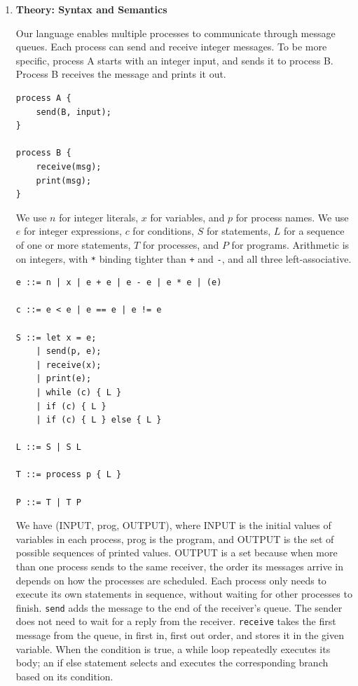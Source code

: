 \documentclass[11pt]{article}
\begin{document}
\begin{enumerate}
\bigbreak


\item
\textbf{Theory: Syntax and Semantics}

Our language enables multiple processes to communicate through message queues. Each process can send and receive
integer messages. To be more specific, process A starts with an integer input, and sends it to process B. Process B
receives the message and prints it out.

\begin{verbatim}
process A {
    send(B, input);
}

process B {
    receive(msg);
    print(msg);
}
\end{verbatim}

We use $n$ for integer literals, $x$ for variables, and $p$ for process names. We use $e$ for integer expressions,
$c$ for conditions, $S$ for statements, $L$ for a sequence of one or more statements, $T$ for processes, and $P$
for programs. Arithmetic is on integers, with \texttt{*} binding tighter than \texttt{+} and \texttt{-}, and all
three left-associative.

\begin{minipage}{\linewidth}
\begin{verbatim}
e ::= n | x | e + e | e - e | e * e | (e)

c ::= e < e | e == e | e != e

S ::= let x = e;
    | send(p, e);
    | receive(x);
    | print(e);
    | while (c) { L }
    | if (c) { L }
    | if (c) { L } else { L }

L ::= S | S L

T ::= process p { L }

P ::= T | T P
\end{verbatim}
\end{minipage}

We have (INPUT, prog, OUTPUT), where INPUT is the initial values of variables in each process, prog is the program,
and OUTPUT is the set of possible sequences of printed values. OUTPUT is a set because when more than one process
sends to the same receiver, the order its messages arrive in depends on how the processes are scheduled. Each
process only needs to execute its own statements in sequence, without waiting for other processes to finish.
\texttt{send} adds the message to the end of the receiver's queue. The sender does not need to wait for a reply
from the receiver. \texttt{receive} takes the first message from the queue, in first in, first out order, and
stores it in the given variable. When the condition is true, a while loop repeatedly executes its body; an if else
statement selects and executes the corresponding branch based on its condition.


\end{enumerate}
\end{document}
